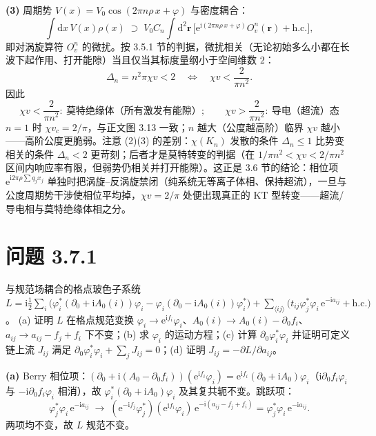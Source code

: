 \textbf{(3)} 周期势 $V(x)=V_0\cos(2\pi n\rho\,x+\varphi)$ 与密度耦合：
\begin{equation*}
\int\mathrm{d}x\,V(x)\rho(x)\;\supset\;
V_0 C_n\int\mathrm{d}^{2}\pmb{r}\,
\big[\mathrm{e}^{\mathrm{i}(2\pi n\rho\,x+\varphi)}O_v^{n}(\pmb{r})+\mathrm{h.c.}\big] ,
\end{equation*}
即对涡旋算符 $O_v^n$ 的微扰。按 3.5.1 节的判据，微扰相关（无论初始多么小都在长波下起作用、打开能隙）当且仅当其标度量纲小于空间维数 $2$：
\begin{equation*}
\Delta_n=n^{2}\pi\chi v<2
\quad\Longleftrightarrow\quad
\chi v<\frac{2}{\pi n^{2}} .
\end{equation*}
因此
\begin{equation*}
\boxed{\;\chi v<\frac{2}{\pi n^{2}}:\ \text{莫特绝缘体（所有激发有能隙）};\qquad
\chi v>\frac{2}{\pi n^{2}}:\ \text{导电（超流）态}\;}
\end{equation*}
$n=1$ 时 $\chi v_c=2/\pi$，与正文图 3.13 一致；$n$ 越大（公度越高阶）临界 $\chi v$ 越小——高阶公度更脆弱。注意 (2)(3) 的差别：$\chi(K_n)$ 发散的条件 $\Delta_n\le1$ 比势变相关的条件 $\Delta_n<2$ 更苛刻；后者才是莫特转变的判据（在 $1/\pi n^{2}<\chi v<2/\pi n^{2}$ 区间内响应率有限，但弱势仍相关并打开能隙）。这正是 3.6 节的结论：相位项 $\mathrm{e}^{\mathrm{i}2\pi\rho\sum q_jx_j}$ 单独时把涡旋--反涡旋禁闭（纯系统无等离子体相、保持超流），一旦与公度周期势干涉使相位平均掉，$\chi v=2/\pi$ 处便出现真正的 KT 型转变——超流/导电相与莫特绝缘体相之分。

\section*{问题 3.7.1}
\begin{problem}
与规范场耦合的格点玻色子系统
$L=\mathrm{i}\frac12\sum_i\big(\varphi_i^{*}(\partial_0+\mathrm{i}A_0(i))\varphi_i-\varphi_i(\partial_0-\mathrm{i}A_0(i))\varphi_i^{*}\big)+\sum_{\langle ij\rangle}\big(t_{ij}\varphi_j^{*}\varphi_i\,\mathrm{e}^{-\mathrm{i}a_{ij}}+\mathrm{h.c.}\big)$。
(a) 证明 $L$ 在格点规范变换 $\varphi_i\to\mathrm{e}^{\mathrm{i}f_i}\varphi_i$、$A_0(i)\to A_0(i)-\partial_0f_i$、$a_{ij}\to a_{ij}-f_j+f_i$ 下不变；(b) 求 $\varphi_i$ 的运动方程；(c) 计算 $\partial_0\varphi_i^{*}\varphi_i$ 并证明可定义链上流 $J_{ij}$ 满足 $\partial_0\varphi_i^{*}\varphi_i+\sum_jJ_{ij}=0$；(d) 证明 $J_{ij}=-\partial L/\partial a_{ij}$。
\end{problem}
\solution

\textbf{(a)} Berry 相位项：$(\partial_0+\mathrm{i}(A_0-\partial_0f_i))(\mathrm{e}^{\mathrm{i}f_i}\varphi_i)
=\mathrm{e}^{\mathrm{i}f_i}(\partial_0+\mathrm{i}A_0)\varphi_i$（$\mathrm{i}\partial_0f_i\varphi_i$ 与 $-\mathrm{i}\partial_0f_i\varphi_i$ 相消），故 $\varphi_i^{*}(\partial_0+\mathrm{i}A_0)\varphi_i$ 及其复共轭不变。跳跃项：
\begin{equation*}
\varphi_j^{*}\varphi_i\,\mathrm{e}^{-\mathrm{i}a_{ij}}
\;\longrightarrow\;
(\mathrm{e}^{-\mathrm{i}f_j}\varphi_j^{*})(\mathrm{e}^{\mathrm{i}f_i}\varphi_i)\,
\mathrm{e}^{-\mathrm{i}(a_{ij}-f_j+f_i)}
=\varphi_j^{*}\varphi_i\,\mathrm{e}^{-\mathrm{i}a_{ij}} .
\end{equation*}
两项均不变，故 $L$ 规范不变。

